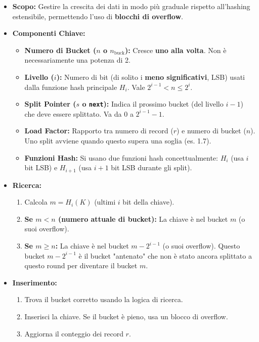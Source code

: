 \begin{itemize}
    \item \textbf{Scopo:} Gestire la crescita dei dati in modo più graduale rispetto all'hashing estensibile, permettendo l'uso di \textbf{blocchi di overflow}.
    \item \textbf{Componenti Chiave:}
    \begin{itemize}
        \item \textbf{Numero di Bucket ($n$ o $n_{\text{buck}}$):} Cresce \textbf{uno alla volta}. Non è necessariamente una potenza di 2.
        \item \textbf{Livello ($i$):} Numero di bit (di solito i \textbf{meno significativi}, LSB) usati dalla funzione hash principale $H_i$. Vale $2^{i-1} < n \le 2^i$.
        \item \textbf{Split Pointer ($s$ o \texttt{next}):} Indica il prossimo bucket (del livello $i-1$) che deve essere splittato. Va da $0$ a $2^{i-1}-1$.
        \item \textbf{Load Factor:} Rapporto tra numero di record ($r$) e numero di bucket ($n$). Uno split avviene quando questo supera una soglia (es. 1.7).
        \item \textbf{Funzioni Hash:} Si usano due funzioni hash concettualmente: $H_i$ (usa $i$ bit LSB) e $H_{i+1}$ (usa $i+1$ bit LSB durante gli split).
    \end{itemize}
    \item \textbf{Ricerca:}
    \begin{enumerate}
        \item Calcola $m = H_i(K)$ (ultimi $i$ bit della chiave).
        \item \textbf{Se $m < n$ (numero attuale di bucket):} La chiave è nel bucket $m$ (o suoi overflow).
        \item \textbf{Se $m \ge n$:} La chiave è nel bucket $m - 2^{i-1}$ (o suoi overflow). Questo bucket $m - 2^{i-1}$ è il bucket "antenato" che non è stato ancora splittato a questo round per diventare il bucket $m$.
    \end{enumerate}
    \item \textbf{Inserimento:}
    \begin{enumerate}
        \item Trova il bucket corretto usando la logica di ricerca.
        \item Inserisci la chiave. Se il bucket è pieno, usa un blocco di overflow.
        \item Aggiorna il conteggio dei record $r$.

\end{enumerate}
\end{itemize}

